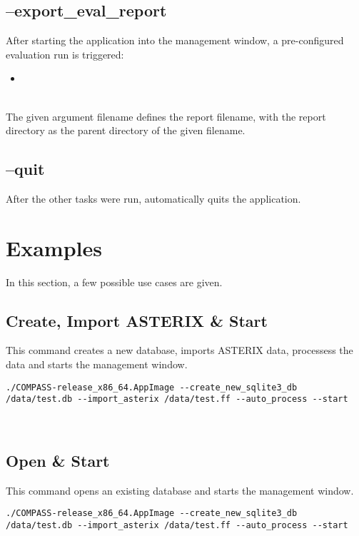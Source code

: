 \subsection{--export\_eval\_report}

After starting the application into the management window, a pre-configured evaluation run is triggered:

\begin{itemize}
 \item {}
\end{itemize}
\ \\

The given argument filename defines the report filename, with the report directory as the parent directory of the given filename.

\subsection{--quit}

After the other tasks were run, automatically quits the application.

\section{Examples}

In this section, a few possible use cases are given.

\subsection{Create, Import ASTERIX \& Start}

This command creates a new database, imports ASTERIX data, processess the data and starts the management window.

\begin{lstlisting}
./COMPASS-release_x86_64.AppImage --create_new_sqlite3_db /data/test.db --import_asterix /data/test.ff --auto_process --start
\end{lstlisting}
\ \\

\subsection{Open \& Start}

This command opens an existing database and starts the management window.

\begin{lstlisting}
./COMPASS-release_x86_64.AppImage --create_new_sqlite3_db /data/test.db --import_asterix /data/test.ff --auto_process --start
\end{lstlisting}
\ \\

